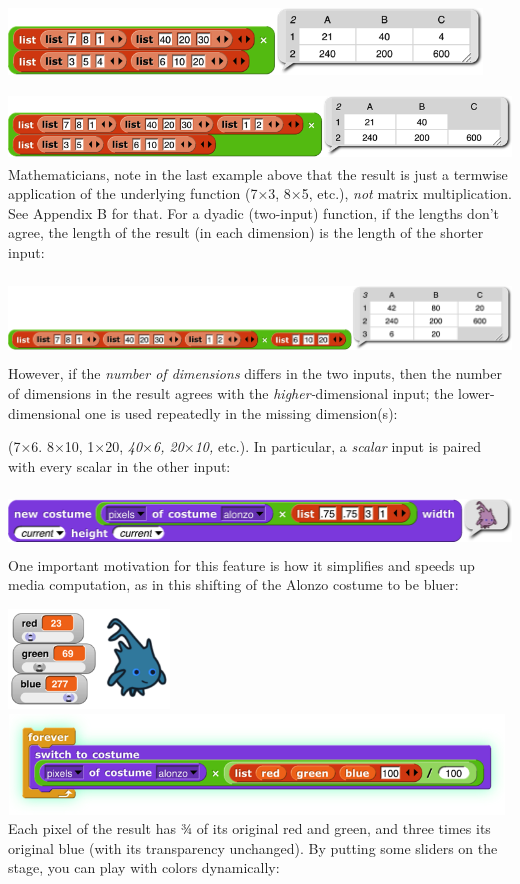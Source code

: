 \includegraphics[width=4.94444in,height=0.69444in]{media/image611.png}

\includegraphics[width=5.74306in,height=0.69444in]{media/image612.png}Mathematicians,
note in the last example above that the result is just a termwise
application of the underlying function (7×3, 8×5, etc.), \emph{not}
matrix multiplication. See Appendix B for that. For a dyadic (two-input)
function, if the lengths don't agree, the length of the result (in each
dimension) is the length of the shorter input:

\includegraphics[width=6.79167in,height=0.86806in]{media/image613.png}However,
if the \emph{number of dimensions} differs in the two inputs, then the
number of dimensions in the result agrees with the
\emph{higher-}dimensional input; the lower-dimensional one is used
repeatedly in the missing dimension(s):

(7×6. 8×10, 1×20, \emph{40}×\emph{6, 20}×\emph{10,} etc.). In
particular, a \emph{scalar} input is paired with every scalar in the
other input:

\includegraphics[width=7.48333in,height=0.63125in]{media/image614.png}One
important motivation for this feature is how it simplifies and speeds up
media computation, as in this shifting of the Alonzo costume to be
bluer:

\includegraphics[width=1.6875in,height=1.04861in]{media/image619.png}\includegraphics[width=5.19444in,height=1.04861in]{media/image620.png}Each
pixel of the result has ¾ of its original red and green, and three times
its original blue (with its transparency unchanged). By putting some
sliders on the stage, you can play with colors dynamically:


